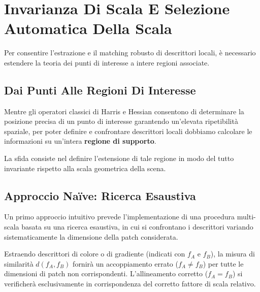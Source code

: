 ﻿\documentclass[11pt, a4paper]{article}
\begin{document}

\newpage

\section{Invarianza Di Scala E Selezione Automatica Della Scala}

Per consentire l'estrazione e il matching robusto di descrittori locali, è necessario estendere la teoria dei punti di interesse a intere regioni associate.

\subsection{Dai Punti Alle Regioni Di Interesse}

Mentre gli operatori classici di Harris e Hessian consentono di determinare la posizione precisa di un punto di interesse garantendo un'elevata ripetibilità spaziale, per poter definire e confrontare descrittori locali dobbiamo calcolare le informazioni su un'intera \textbf{regione di supporto}.


La sfida consiste nel definire l'estensione di tale regione in modo del tutto invariante rispetto alla scala geometrica della scena.

\subsection{Approccio Naïve: Ricerca Esaustiva}

Un primo approccio intuitivo prevede l'implementazione di una procedura multi-scala basata su una ricerca esaustiva, in cui si confrontano i descrittori variando sistematicamente la dimensione della patch considerata.


Estraendo descrittori di colore o di gradiente (indicati con $f_A$ e $f_B$), la misura di similarità $d(f_A, f_B)$ fornirà un accoppiamento errato ($f_A \neq f_B$) per tutte le dimensioni di patch non corrispondenti. L'allineamento corretto ($f_A = f_B$) si verificherà esclusivamente in corrispondenza del corretto fattore di scala relativo.
\end{document}
